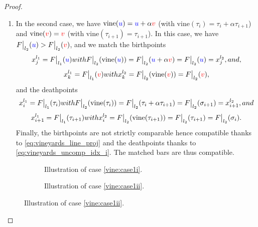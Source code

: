 \documentclass{article}
\newcommand{\vine}{\mathrm{vine}}
\newcommand\restr[2]{{  \left.\kern-\nulldelimiterspace #1 \vphantom{\big|} \right|_{#2}  }}
\begin{document}
\begin{proof}
\begin{enumerate}
\begin{enumerate}
\begin{enumerate}
						\item \label{vine:negnok} In the second case, we have
							$\vine(\u) = \u+\alpha\v$ (with $\vine(\tau_i) =
							\tau_i + \alpha \tau_{i+1}$)
							and $\vine(\v) = \v$ (with $\vine(\tau_{i+1}) =
							\tau_{i+1}$).
							In this case, we have $\restr F {l_2} (\u) > \restr F {l_2}(\v)$, and we match the birthpoints
							\begin{equation*}
								x_j^{l_1} = \restr F {l_1} (\u) \textnormal{ with }
								\restr F {l_2}(\vine(\u)) =
								\restr F {l_2}(\u + \alpha\v )  = \restr F {l_2} (\u) = x_j^{l_2},
								\textnormal{ and,}
							\end{equation*}
							\begin{equation*}
								x_k^{l_1} = \restr F {l_1} (\v) \textnormal{ with }
								x_{k}^{l_2} = \restr F {l_2}(\vine(\v)) =
								\restr F {l_2}(\v),
							\end{equation*}
							and the deathpoints
							\begin{equation*}
								x_i^{l_1} = \restr F {l_1} (\tau_i) \textnormal{ with }
								\restr F {l_2}(\vine(\tau_i)) =
								\restr F {l_2}(\tau_i + \alpha\tau_{i+1}) =
								\restr F {l_2} (\sigma_{i+1}) =
								x_{i+1}^{l_2},
								\textnormal{ and }
							\end{equation*}
							\begin{equation*}
								x_{i+1}^{l_1} = \restr F {l_1} (\tau_{i+1}) \textnormal{ with }
								x_{i}^{l_2} = \restr F {l_2}(\vine(\tau_{i+1})) =
								\restr F {l_2}(\tau_{i+1}) = \restr F {l_2}(\sigma_i).
							\end{equation*}
							Finally, the birthpoints are not strictly comparable hence compatible thanks to
							\cref{eq:vineyards_line_proj}
							and the deathpoints thanks to
							\cref{eq:vineyards_uncomp_idx_i}.
							The matched bars are thus compatible.
					\end{enumerate}
			\end{enumerate}
			\begin{figure}[H]
				\centering
				\begin{subfigure}[b]{.45\textwidth}
					
					\caption{Illustration of case \ref{vine:case1i}.}
					\label{fig:vine1.i}
				\end{subfigure}
				\hfill
				\begin{subfigure}[b]{.45\textwidth}
					
					\caption{Illustration of case \ref{vine:case1ii}.}\label{fig:vine1.ii}

\end{subfigure}
\end{figure}
\end{enumerate}
\end{proof}
\end{document}

